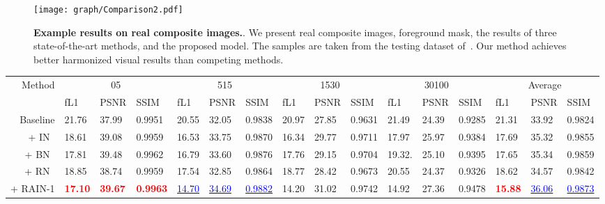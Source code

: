 \documentclass[final]{cvpr}
\begin{document}
\begin{figure*}[!htbp]
\begin{center}
\texttt{[image: graph/Comparison2.pdf]}
\end{center}
   \caption{\textbf{Example results on real composite images.}. We present real composite images, foreground mask, the results of three state-of-the-art methods, and the proposed model. The samples are taken from the testing dataset of~\cite{tsai2017deep}. Our method achieves better harmonized visual results than competing methods. }
   \label{fig:comparison2}
\end{figure*}


\begin{table*}[!htp]
\footnotesize
\begin{center}
\begin{tabular}{rp{0.5cm}<{\centering}p{0.6cm}<{\centering}p{0.6cm}<{\centering}p{0.5cm}<{\centering}p{0.6cm}<{\centering}p{0.6cm}<{\centering}p{0.6cm}<{\centering}p{0.6cm}<{\centering}p{0.6cm}<{\centering}p{0.5cm}<{\centering}p{0.6cm}<{\centering}p{0.6cm}<{\centering}p{0.6cm}<{\centering}p{0.6cm}<{\centering}p{0.6cm}<{\centering}}
\toprule
\multirow{2}{*}{Method} & \multicolumn{3}{c}{05} & \multicolumn{3}{c}{515} & \multicolumn{3}{c}{1530} & \multicolumn{3}{c}{30100}& \multicolumn{3}{c}{Average} \\
\cmidrule(r){2-4}
\cmidrule(r){5-7}
\cmidrule(r){8-10}
\cmidrule(r){11-13}
\cmidrule(r){14-16}
 & fL1  & PSNR & SSIM  & fL1  & PSNR & SSIM &  fL1  & PSNR & SSIM &  fL1  & PSNR & SSIM &  fL1  & PSNR & SSIM \\
\midrule
Baseline & 21.76 & 37.99 & 0.9951 & 20.55 & 32.05 & 0.9838 & 20.97 & 27.85 & 0.9631 & 21.49 & 24.39 & 0.9285 & 21.31 & 33.92 & 0.9824 \\
+ IN~\cite{ulyanov2016instance} & 18.61 & 39.08 & 0.9959 & 16.53 & 33.75 & 0.9870 & 16.34 & 29.77 & 0.9711 & 17.97 & 25.97 & 0.9384 & 17.69 & 35.32 & 0.9855 \\
+ BN~\cite{ioffe2015batch} & 17.81 & 39.48 & 0.9962 & 16.79 & 33.60 & 0.9876 & 17.76 & 29.15 & 0.9704 & 19.32. & 25.10 & 0.9395 & 17.65 & 35.34 & 0.9859 \\
+ RN~\cite{yu2020region} & 18.85 & 38.74 & 0.9959 & 17.54 & 32.85 & 0.9864 & 18.77 & 28.42 & 0.9673 & 20.55 & 24.37 & 0.9326 & 18.62 & 34.57 & 0.9842 \\
\midrule 
+ RAIN-1 & \textcolor{red}{\textbf{17.10}} & \textcolor{red}{\textbf{39.67}} & \textcolor{red}{\textbf{0.9963}} & \textcolor{blue}{\underline{14.70}} & \textcolor{blue}{\underline{34.69}} & \textcolor{blue}{\underline{0.9882}} & 14.20 & 31.02 & {0.9742} & 14.92 & 27.36 & 0.9478 & \textcolor{red}{\textbf{15.88}} & \textcolor{blue}{\underline{36.06}} & \textcolor{blue}{\underline{0.9873}} \\


\end{tabular}
\end{center}
\end{table*}
\end{document}
